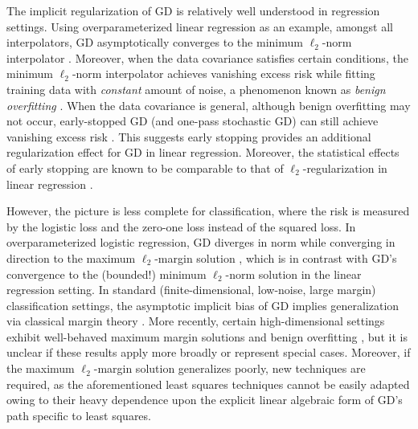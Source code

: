 \documentclass[11pt]{article}
\begin{document}
The implicit regularization of GD is relatively well understood in regression settings. Using overparameterized linear regression as an example, amongst all interpolators, GD asymptotically converges to the minimum $\ell_2$-norm interpolator \citep{zhang2021understanding}. Moreover, when the data covariance satisfies certain conditions, the minimum $\ell_2$-norm interpolator achieves vanishing excess risk while fitting training data with \emph{constant} amount of noise, 
a phenomenon known as \emph{benign overfitting} \citep[see][and references therein]{bartlett2020benign,tsigler2023benign}.
When the data covariance is general, although benign overfitting may not occur, early-stopped GD (and one-pass stochastic GD) can still achieve vanishing excess risk \citep{buhlmann2003boosting,yao2007early,lin2017optimal,dieuleveut2016nonparametric,zou2023benign,zou2022risk,wu2022last}. This suggests early stopping provides an additional regularization effect for GD in linear regression.
Moreover, the statistical effects of early stopping are known to be comparable to that of $\ell_2$-regularization in linear regression \citep{suggala2018connecting,ali2019continuous,zou2021benefits}.


However, the picture is less complete for classification, 
where the risk is measured by the logistic loss and the zero-one loss instead of the squared loss. 
In overparameterized logistic regression,
GD diverges in norm while converging in direction to the maximum $\ell_2$-margin solution \citep[see][and  in ]{soudry2018implicit,ji2018risk}, which is in contrast with GD's convergence to the (bounded!) minimum $\ell_2$-norm solution in the linear regression setting. 
In standard (finite-dimensional, low-noise, large margin) classification settings, the asymptotic implicit bias of GD implies generalization via classical margin theory \citep{bartlett1999generalization}.  More recently,
certain high-dimensional settings exhibit well-behaved
maximum margin solutions and benign overfitting \citep[see][for example]{montanari2019generalization}, but it is unclear if these
results apply more broadly or represent special cases.
Moreover, if the maximum $\ell_2$-margin solution generalizes poorly,
new techniques are required, as the aforementioned least squares techniques
cannot be easily adapted owing to their heavy dependence upon the explicit linear algebraic form
of GD's path specific to least squares.
\end{document}
